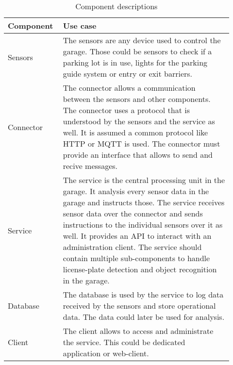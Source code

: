 \begin{table}[H]
    \begin{tabular}{p{0.2\linewidth} p{0.72\linewidth}}
        \rowcolor{TableHeaderClr}
        \hline
        \textbf{Component} & \textbf{Use case} \\
        \hline
        Sensors & The sensors are any device used to control the garage. Those could be sensors to check if a parking lot is in use, lights for the parking guide system or entry or exit barriers. \\
        Connector & The connector allows a communication between the sensors and other components. The connector uses a protocol that is understood by the sensors and the service as well. It is assumed a common protocol like HTTP or MQTT is used. The connector must provide an interface that allows to send and recive messages. \\
        Service & The service is the central processing unit in the garage. It analysis every sensor data in the garage and instructs those. The service receives sensor data over the connector and sends instructions to the individual sensors over it as well. It provides an API to interact with an administration client. The service should contain multiple sub-components to handle license-plate detection and object recognition in the garage.\\
        Database & The database is used by the service to log data received by the sensors and store operational data. The data could later be used for analysis.\\
        Client & The client allows to access and administrate the service. This could be dedicated application or web-client.\\
        \hline
        \end{tabular}
    \caption{Component descriptions}
    \label{tab:my_label}
\end{table}
